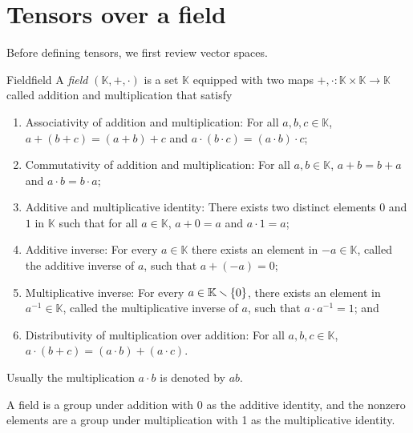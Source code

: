 \section{Tensors over a field}

Before defining tensors, we first review vector spaces.

\begin{definition}{Field}{field}
    A \emph{field} \((\mathbb{K}, +, \cdot)\) is a set \(\mathbb{K}\) equipped with two maps \(+, \cdot : \mathbb{K} \times \mathbb{K} \to \mathbb{K}\) called addition and multiplication that satisfy
    \begin{enumerate}[label=(\alph*)]
        \item Associativity of addition and multiplication: For all \(a,b,c \in \mathbb{K}\), \(a + (b + c) = (a + b) + c\) and \(a \cdot (b\cdot c) = (a\cdot b) \cdot c\);
        \item Commutativity of addition and multiplication: For all \(a,b \in \mathbb{K}\), \(a + b = b + a\) and \(a\cdot b = b\cdot a\);
        \item Additive and multiplicative identity: There exists two distinct elements \(0\) and \(1\) in \(\mathbb{K}\) such that for all \(a \in \mathbb{K}\), \(a + 0 = a\) and \(a \cdot 1 = a\);
        \item Additive inverse: For every \(a \in \mathbb{K}\) there exists an element in \(-a \in \mathbb{K}\), called the additive inverse of \(a\), such that \(a + (-a) = 0\);
        \item Multiplicative inverse: For every \(a \in \mathbb{K} \smallsetminus \{0\}\), there exists an element in \(a^{-1} \in \mathbb{K}\), called the multiplicative inverse of \(a\), such that \(a \cdot a^{-1} = 1\); and
        \item Distributivity of multiplication over addition: For all \(a, b, c \in \mathbb{K}\), \(a \cdot (b + c) = (a \cdot b) + (a\cdot c)\).
    \end{enumerate}
    Usually the multiplication \(a \cdot b\) is denoted by \(ab\).
\end{definition}
\begin{remark}
    A field is a group under addition with 0 as the additive identity, and the nonzero elements are a group under multiplication with 1 as the multiplicative identity.
\end{remark}

